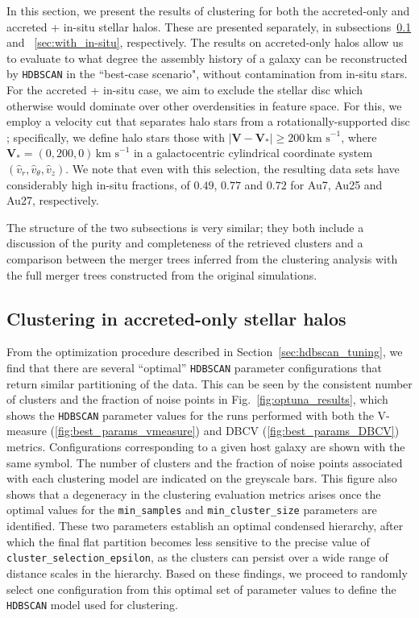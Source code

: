 In this section, we present the results of clustering for both the accreted-only and accreted + in-situ stellar halos. These are presented separately, in 
subsections~\ref{sec:accreted_only} and ~\ref{sec:with_in-situ}, respectively. The results on accreted-only halos allow us to evaluate to what degree the assembly history of a galaxy can be reconstructed by \texttt{HDBSCAN} in the ``best-case scenario", without contamination from in-situ stars. For the accreted + in-situ case, we aim to exclude the stellar disc which otherwise would dominate over other overdensities in feature space. For this, we employ a velocity cut that separates halo stars from a rotationally-supported disc \citep[e.g.,][]{Koppelman2019}; specifically, we define halo stars those with $|\mathbf{V}-\mathbf{V_{*}}| \geq 200 \, \text{km s}^{-1}$, where $\mathbf{V_{*}}=(0,200,0) \, \text{km s}^{-1}$ in a galactocentric cylindrical coordinate system $(\hat{v}_r, \hat{v}_{\theta}, \hat{v}_z)$. We note that even with this selection, the resulting data sets have considerably high in-situ fractions, of $0.49$, $0.77$ and $0.72$ for Au7, Au25 and Au27, respectively.

The structure of the two subsections is very similar; they both include a discussion of the purity and completeness of the retrieved clusters and a comparison between the merger trees inferred from the clustering analysis with the full merger trees constructed from the original simulations.

\subsection{Clustering in accreted-only stellar halos}
\label{sec:accreted_only}

From the optimization procedure described in Section~\ref{sec:hdbscan_tuning}, we find that there are several ``optimal'' \texttt{HDBSCAN} parameter  configurations that return similar partitioning of the data. This can be seen by the consistent number of clusters and the fraction of noise points in Fig.~\ref{fig:optuna_results}, which shows the \texttt{HDBSCAN} parameter values for the runs performed with both the V-measure (\ref{fig:best_params_vmeasure}) and DBCV (\ref{fig:best_params_DBCV}) metrics. Configurations corresponding to a given host galaxy are shown with the same symbol. The number of clusters and the fraction of noise points associated with each clustering model are indicated on the greyscale bars.  This figure also shows that a degeneracy in the clustering evaluation metrics arises once the optimal values for the \texttt{min\_samples} and \texttt{min\_cluster\_size} parameters are identified. These two parameters establish an optimal condensed hierarchy, after which the final flat partition becomes less sensitive to the precise value of \texttt{cluster\_selection\_epsilon}, as the clusters can persist over a wide range of distance scales in the hierarchy. Based on these findings, we proceed to randomly select one configuration from this optimal set of parameter values to define the \texttt{HDBSCAN} model used for clustering.


